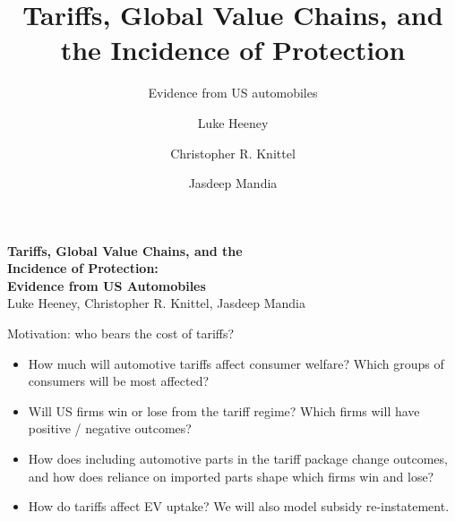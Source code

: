 \documentclass[aspectratio=169,11pt]{beamer}
\title{Tariffs, Global Value Chains, and the Incidence of Protection}
\subtitle{Evidence from US automobiles}
\author{Luke Heeney \and Christopher R. Knittel \and Jasdeep Mandia}
\date{}
\begin{document}
\begin{frame}[plain]
  \vspace{0.95cm}
  {\LARGE\bfseries Tariffs, Global Value Chains, and the\\[0.12cm] Incidence of Protection:\\[0.12cm] Evidence from US Automobiles}\\[0.55cm]
  {\large Luke Heeney, Christopher R. Knittel, Jasdeep Mandia}
  \vfill
\end{frame}

\begin{frame}{Motivation: who bears the cost of tariffs?}
  \vspace{0.35cm}
  \begin{itemize}
    \item How much will automotive tariffs affect consumer welfare? Which groups of consumers will be most affected?
    \item Will US firms win or lose from the tariff regime? Which firms will have positive / negative outcomes?
    \item How does including automotive parts in the tariff package change outcomes, and how does reliance on imported parts shape which firms win and lose?
    \item How do tariffs affect EV uptake? We will also model subsidy re-instatement.
  \end{itemize}
\end{frame}
\end{document}
